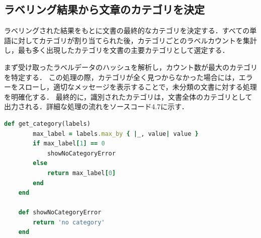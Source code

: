 \clearpage

\subsection{ラベリング結果から文章のカテゴリを決定}
\label{subsec:app_classify}

ラベリングされた結果をもとに文書の最終的なカテゴリを決定する．すべての単語に対してカテゴリが割り当てられた後，カテゴリごとのラベルカウントを集計し，最も多く出現したカテゴリを文書の主要カテゴリとして選定する．

まず受け取ったラベルデータのハッシュを解析し，カウント数が最大のカテゴリを特定する．
この処理の際，カテゴリが全く見つからなかった場合には，エラーをスローし，適切なメッセージを表示することで，未分類の文書に対する処理を明確化する．
最終的に，識別されたカテゴリは，文書全体のカテゴリとして出力される．詳細な処理の流れをソースコード4.7に示す．

\begin{lstlisting}[language=Ruby, caption=文書のカテゴリを決定するメソッド]
    def get_category(labels)
        max_label = labels.max_by { |_, value| value }
        if max_label[1] == 0
            showNoCategoryError
        else
            return max_label[0]
        end
    end

    def showNoCategoryError
        return 'no category'
    end
\end{lstlisting}
